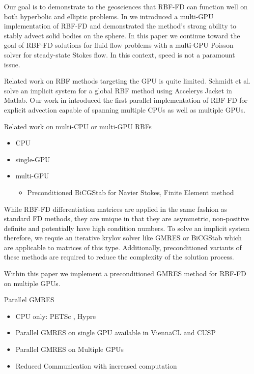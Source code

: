 Our goal is to demonstrate to the geosciences that RBF-FD can function well on
both hyperbolic and elliptic problems. In \cite{bolligFlyerErlebacher2011} we
introduced a multi-GPU implementation of RBF-FD and demonstrated the method's
strong ability to stably advect solid bodies on the sphere. In this paper we
continue toward the goal of RBF-FD solutions for fluid flow problems with a
multi-GPU Poisson solver for steady-state Stokes flow. In this context, speed is
not a paramount issue.

Related work on RBF methods targeting the GPU is quite limited. Schmidt et al.
\cite{Schmidt2009b} solve an implicit system for a global RBF method using
Accelerys Jacket in Matlab. Our work in \cite{Bollig2011} introduced the first
parallel implementation of RBF-FD for explicit advection capable of spanning
multiple CPUs as well as multiple GPUs. 

Related work on multi-CPU or multi-GPU RBFs
\begin{itemize} 
	\item CPU \cite{Yokota2010} \cite{Wildemann2009}
	\item single-GPU \cite{Schmidt2009b}
	\item multi-GPU 
	\begin{itemize} 
	\item Preconditioned BiCGStab for Navier Stokes, Finite Element method \cite{Goeddeke2009a} 
	\end{itemize} 
\end{itemize} 

While RBF-FD differentiation matrices are applied in the same fashion as standard FD methods, they are unique in that they are asymmetric, non-positive definite and potentially have high condition numbers. To solve an implicit system therefore, we requie an iterative krylov solver like GMRES or BiCGStab which are applicable to matrices of this type. Additionally, preconditioned variants of these methods are required to reduce the complexity of the solution process. 

Within this paper we implement a preconditioned GMRES method for RBF-FD on multiple GPUs. 

Parallel GMRES
\begin{itemize} 
	\item CPU only: PETSc \cite{Yokota2010}, Hypre \cite{Wildemann2009} 
	\item Parallel GMRES on single GPU available in ViennaCL \cite{Rupp2010} and CUSP \cite{Cusp2010}
	\item Parallel GMRES on Multiple GPUs \cite{Bahi2011}
	\item Reduced Communication with increased computation \cite{Dekker2000}
\end{itemize} 

